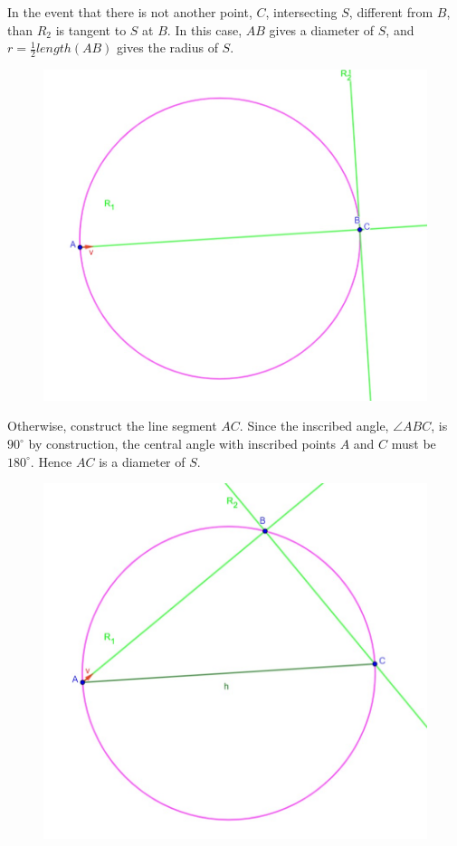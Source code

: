 \documentclass[11pt]{amsart}
\theoremstyle{plain}
\theoremstyle{definition}
\theoremstyle{remark}
\begin{document}
In the event that there is not another point, \(C\), intersecting
\(S\), different from \(B\), than \(R_2\) is tangent to \(S\) at
\(B\).  In this case, \(AB\) gives a diameter of \(S\), and
\(r=\frac{1}{2}length(AB)\) gives the radius of \(S\).
\begin{center}
	\begin{figure}[h]
		\includegraphics[scale=0.5]{circle_5_b.jpg}
	\end{figure}
\end{center}
Otherwise, construct the line segment \(AC\).  Since the inscribed
angle, \(\angle ABC\), is \(90^{\circ}\) by construction, the central
angle with inscribed points \(A\) and \(C\) must be \(180^{\circ}\).
Hence \(AC\) is a diameter of \(S\).
\begin{center}
	\begin{figure}[h]
		\includegraphics[scale=0.5]{circle_6.jpg}
	\end{figure}
\end{center}
\end{document}
